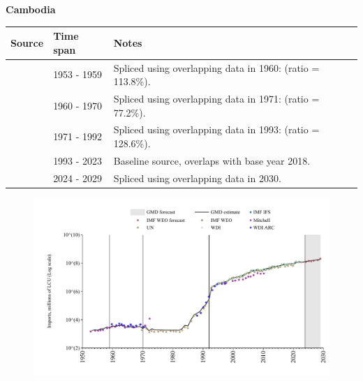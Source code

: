 \documentclass[12pt,a4paper,landscape]{article}
\begin{document}
\begin{adjustbox}{max totalsize={\paperwidth}{\paperheight},center}
\begin{minipage}[t][\textheight][t]{\textwidth}
\vspace*{0.5cm}
{}
\begin{center}
{\Large\bfseries Cambodia}
\end{center}
\vspace{0.5cm}
\begin{table}[H]
\centering
\small
\begin{tabular}{|l|l|l|}
\hline
\textbf{Source} & \textbf{Time span} & \textbf{Notes} \\
\hline
\rowcolor{white}\cite{Mitchell}& 1953 - 1959 &Spliced using overlapping data in 1960: (ratio = 113.8\%).\\
\rowcolor{lightgray}\cite{WDI}& 1960 - 1970 &Spliced using overlapping data in 1971: (ratio = 77.2\%).\\
\rowcolor{white}\cite{UN}& 1971 - 1992 &Spliced using overlapping data in 1993: (ratio = 128.6\%).\\
\rowcolor{lightgray}\cite{WDI}& 1993 - 2023 &Baseline source, overlaps with base year 2018.\\
\rowcolor{white}\cite{IMF_WEO_forecast}& 2024 - 2029 &Spliced using overlapping data in 2030.\\
\hline
\end{tabular}
\end{table}
\begin{figure}[H]
\centering
\includegraphics[width=\textwidth,height=0.6\textheight,keepaspectratio]{graphs/KHM_imports.pdf}
\end{figure}
\end{minipage}
\end{adjustbox}
\end{document}
